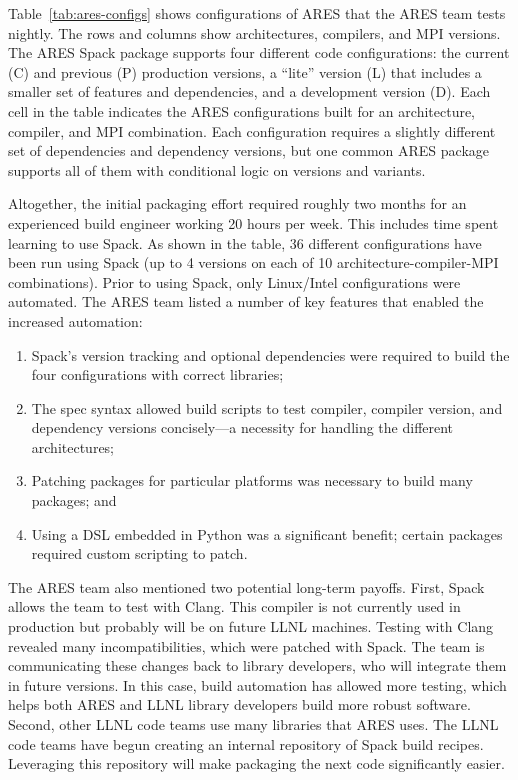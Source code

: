 Table~\ref{tab:ares-configs} shows configurations of ARES that the ARES
team tests nightly.  The rows and columns show architectures, compilers, and MPI versions.
The ARES Spack package supports four different code configurations:
the current (C) and previous (P) production versions, a ``lite'' version (L) that includes
a smaller set of features and dependencies, and a development version (D).
Each cell in the table indicates the ARES configurations built for an architecture,
compiler, and MPI combination. Each configuration requires a slightly different
set of dependencies and dependency versions, but one common ARES package supports
all of them with conditional logic on versions and variants.

Altogether, the initial packaging effort required roughly two months 
for an experienced build engineer working 20 hours per week. This includes
time spent learning to use Spack.
As shown in the table, 36 different configurations have been run using Spack
(up to 4 versions on each of 10 architecture-compiler-MPI combinations).
Prior to using Spack, only Linux/Intel configurations were automated. The ARES 
team listed a number of key features that enabled the increased automation:
\begin{enumerate}
\item Spack's version tracking and optional dependencies were required to
      build the four configurations with correct libraries;
\item The spec syntax allowed build scripts to test compiler,
      compiler version, and dependency versions concisely---a necessity
      for handling the different architectures;
\item Patching packages for particular platforms was
      necessary to build many packages; and
\item Using a DSL embedded in Python was a significant benefit;
      certain packages required custom scripting to patch.
\end{enumerate}

The ARES team also mentioned two potential long-term payoffs. First, Spack 
allows the team to test with Clang.  This compiler is not currently used in
production but probably will be on future LLNL machines. Testing with Clang 
revealed many incompatibilities, which were patched with Spack. The team is 
communicating these changes back to library developers, who will integrate 
them in future versions. In this case, build automation has allowed more 
testing, which helps both ARES and LLNL library developers build more robust 
software. Second, other LLNL code teams use many libraries that ARES uses.
The LLNL code teams have begun creating an internal repository of Spack 
build recipes.  Leveraging this repository will make packaging the next 
code significantly easier.




